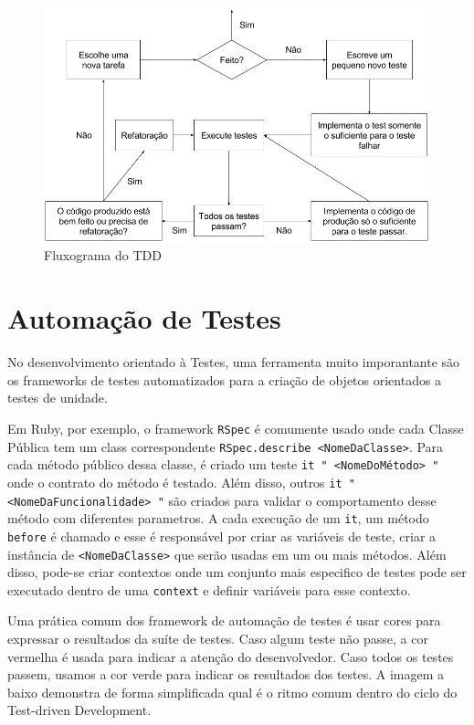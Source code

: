 \documentclass[12pt]{article}
\newcommand{\code}[1]{\texttt{#1}}
\begin{document}
  \begin{figure}[H]
    \centering
    \includegraphics[scale=0.4]{tdd}
    \caption{Fluxograma do TDD}
  \end{figure}

  \section{Automação de Testes}

  No desenvolvimento orientado à Testes, uma ferramenta muito imporantante são
  os frameworks de testes automatizados para a criação de objetos orientados
  a testes de unidade. 

  Em Ruby, por exemplo, o framework \code{RSpec} é comumente usado onde cada 
  Classe Pública tem um class correspondente 
  \code{RSpec.describe <NomeDaClasse>}. Para cada método público dessa classe, 
  é criado um teste \code{it " <NomeDoMétodo> "} onde o 
  contrato do método é testado. Além disso, outros 
  \code{it " <NomeDaFuncionalidade> "}
  são criados para validar o comportamento desse método com diferentes 
  parametros. A cada execução de um \code{it}, um método 
  \code{before} é chamado e esse é responsável por criar as variáveis de teste,
  criar a instância de \code{<NomeDaClasse>} que serão usadas em um ou mais 
  métodos. Além disso, pode-se criar contextos onde um conjunto mais especifico
  de testes pode ser executado dentro de uma \code{context} e definir variáveis
  para esse contexto.

  Uma prática comum dos framework de automação de testes é usar cores
  para expressar o resultados da suíte de testes. Caso algum teste não passe,
  a cor vermelha é usada para indicar a atenção do desenvolvedor. Caso todos os
  testes passem, usamos a cor verde para indicar os resultados dos testes. A 
  imagem a baixo demonstra de forma simplificada qual é o ritmo comum dentro do
  ciclo do Test-driven Development.
\end{document}
